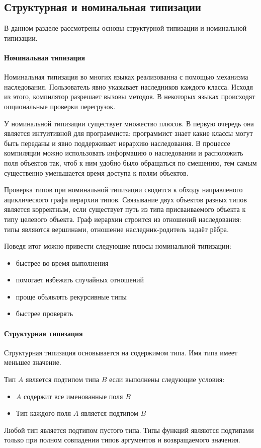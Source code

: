 \subsection{Структурная и номинальная типизации}
В данном разделе рассмотрены основы структурной типизации и номинальной типизации.

\paragraph{Номинальная типизация}
Номинальная типизация во многих языках реализованна с помощью механизма наследования\cite{book:pierce}. Пользователь явно указывает наследников каждого класса. Исходя из этого, компилятор разрешает вызовы методов. В некоторых языках происходят опциональные проверки перегрузок.

У номинальной типизации существует множество плюсов. В первую очередь она является интуитивной для программиста: программист знает какие классы могут быть переданы и явно поддерживает иерархию наследования. В процессе компиляции можно использовать информацию о наследовании и расположить поля объектов так, чтоб к ним удобно было обращаться по смешению, тем самым существенно уменьшается время доступа к полям объектов.

Проверка типов при номинальной типизации сводится к обходу направленого ациклического графа иерархии типов. Связывание двух объектов разных типов является корректным, если существует путь из типа присваиваемого объекта к типу целевого объекта. Граф иерархии строится из отношений наследования: типы являются вершинами, отношение наследник-родитель задаёт рёбра.

Поведя итог можно привести следующие плюсы номинальной типизации:
\begin{itemize}
    \item быстрее во время выполнения
    \item помогает избежать случайных отношений
    \item проще объявлять рекурсивные типы
    \item быстрее проверять
\end{itemize}

\paragraph{Структурная типизация}
Структурная типизация основывается на содержимом типа\cite{book:pierce}. Имя типа имеет меньшее значение.

Тип $A$ является подтипом типа $B$ если выполнены следующие условия:
\begin{itemize}
    \item $A$ содержит все именованные поля $B$
    \item Тип каждого поля $A$ является подтипом $B$
\end{itemize}
Любой тип является подтипом пустого типа. Типы функций являются подтипами только при полном совпадении типов аргументов и возвращаемого значения.

